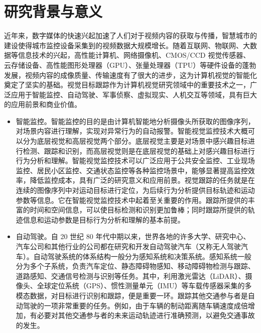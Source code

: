 \section{研究背景与意义}
近年来，数字媒体的快速兴起加速了人们对于视频内容的获取与传播，智慧城市的建设使得城市监控设备采集到的视频数据大规模增长。随着互联网、物联网、大数据等信息技术的兴起，高性能计算机、网络摄像机、CMOS/CCD 视觉传感器、云存储设备、高性能图形处理器（GPU）、张量处理器（TPU）等硬件设备的蓬勃发展，视频内容的成像质量、传输速度有了很大的进步，这为计算机视觉的智能化奠定了坚实的基础。视觉目标跟踪作为计算机视觉研究领域中的重要技术之一，广泛应用于智能监控、自动驾驶、军事侦察、虚拟现实、人机交互等领域，具有巨大的应用前景和商业价值。
\begin{itemize}
\item 智能监控。智能监控的目的是由计算机智能地分析摄像头所获取的图像序列，对场景内容进行理解，实现对异常行为的自动报警。智能视觉监控技术大概可以分为底层视觉和高层视觉两个部分。底层视觉主要是对场景中感兴趣目标进行检测、跟踪和识别，而高层视觉则是在底层视觉的基础上对感兴趣目标进行行为分析和理解。智能视觉监控技术可以广泛应用于公共安全监控、工业现场监控、居民小区监控、交通状态监控等各种监控场景中，能够显著提高监控效率，降低监控成本，具有广泛的研究意义和应用前景。视觉跟踪的任务就是在连续的图像序列中对运动目标进行定位，为后续行为分析提供目标轨迹和运动参数等信息。它在智能视觉监控技术中起着至关重要的作用。跟踪所提供的丰富的时间和空间信息，可以使目标检测和识别更加鲁棒；同时跟踪所提供的轨迹信息和运动参数是目标行为分析和理解的基本前提。
\item 自动驾驶。自 20 世纪 80 年代中期以来，世界各地的许多大学、研究中心、汽车公司和其他行业的公司都在研究和开发自动驾驶汽车（又称无人驾驶汽车）。自动驾驶系统的体系结构一般分为感知系统和决策系统。感知系统一般分为多个子系统，负责汽车定位、静态障碍物感知、移动障碍物检测与跟踪、道路感知、交通信号检测与识别等任务。其中，利用激光雷达（LiDAR）、摄像头、全球定位系统（GPS）、惯性测量单元（IMU）等车载传感器采集的多模态数据，对目标进行识别和跟踪，便是重要一环。跟踪其他交通参与者是自动驾驶的一项非常重要的任务。例如，由于车辆的制动距离随车辆速度成倍增加，有必要对其他交通参与者的未来运动轨迹进行准确预测，以避免交通事故的发生。

\end{itemize}
